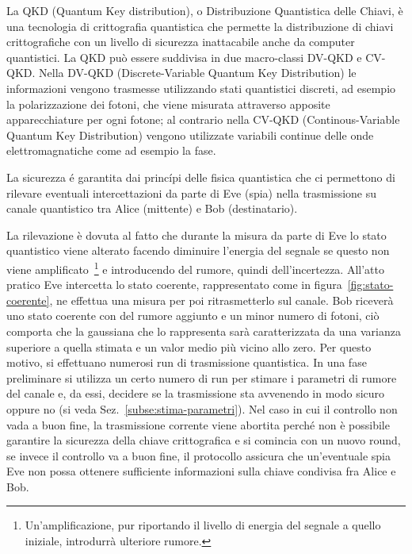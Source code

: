 La QKD (Quantum Key distribution), o Distribuzione Quantistica delle Chiavi, \`e una tecnologia di crittografia quantistica che permette la distribuzione di chiavi crittografiche con un livello di sicurezza inattacabile anche da computer quantistici. La QKD pu\`o essere suddivisa in due macro-classi DV-QKD e CV-QKD. Nella DV-QKD (Discrete-Variable Quantum Key Distribution) le informazioni vengono trasmesse utilizzando stati quantistici discreti, ad esempio la polarizzazione dei fotoni, che viene misurata attraverso apposite apparecchiature per ogni fotone; al contrario nella CV-QKD (Continous-Variable Quantum Key Distribution) vengono utilizzate variabili continue delle onde elettromagnatiche come ad esempio la fase.

La sicurezza \'e garantita dai princ\'ipi delle fisica quantistica che ci permettono di rilevare eventuali intercettazioni da parte di Eve (spia) nella trasmissione su canale quantistico tra Alice (mittente) e Bob (destinatario).

La rilevazione \`e dovuta al fatto che durante la misura da parte di Eve lo stato quantistico viene alterato facendo diminuire l'energia del segnale se questo non viene amplificato~\footnote{Un'amplificazione, pur riportando il livello di energia del segnale a quello iniziale, introdurr\`a ulteriore rumore.} e introducendo del rumore, quindi dell'incertezza. All'atto pratico Eve intercetta lo stato coerente, rappresentato come in figura~\ref{fig:stato-coerente}, ne effettua una misura per poi ritrasmetterlo sul canale. Bob ricever\`a uno stato coerente con del rumore aggiunto e un minor numero di fotoni, ci\`o comporta che la gaussiana che lo rappresenta sar\`a caratterizzata da una varianza superiore a quella stimata e un valor medio pi\`u vicino allo zero. Per questo motivo, si effettuano numerosi run di trasmissione quantistica. In una fase preliminare si utilizza un certo numero di run per stimare i parametri di rumore del canale e, da essi, decidere se la trasmissione sta avvenendo in modo sicuro oppure no (si veda Sez.~\ref{subse:stima-parametri}). Nel caso in cui il controllo non vada a buon fine, la trasmissione corrente viene abortita perch\'e non \`e possibile garantire la sicurezza della chiave crittografica e si comincia con un nuovo round, se invece il controllo va a buon fine, il protocollo assicura che un'eventuale spia Eve non possa ottenere sufficiente informazioni sulla chiave condivisa fra Alice e Bob.

